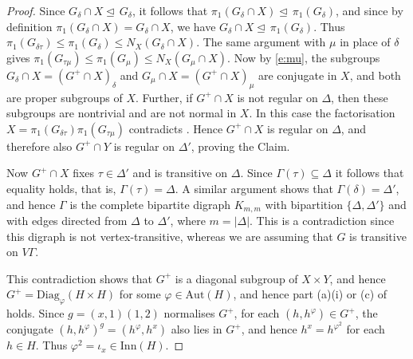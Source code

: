 \documentclass[11pt]{amsart}
\newcommand{\Aut}{\mathrm{Aut}}
\newcommand{\Inn}{\mathrm{Inn}}
\newcommand{\Diag}{\mathrm{Diag}}
\begin{document}
\begin{proof}
    Since \(G_{\delta}\cap X\unlhd\, G_{\delta}\), it follows that \(\pi_{1}(G_{\delta}\cap X)\unlhd\,\pi_{1}(G_{\delta})\), and since by definition $\pi_{1}(G_{\delta}\cap X) = G_{\delta}\cap X$, we have $G_{\delta}\cap X \unlhd\, \pi_{1}(G_{\delta})$. Thus $\pi_{1}(G_{\delta\tau})\leqslant \pi_{1}(G_{\delta})\leqslant N_X(G_\delta\cap X)$. The same argument with $\mu$ in place of $\delta$ gives $\pi_{1}(G_{\tau\mu})\leqslant \pi_{1}(G_{\mu})\leqslant N_X(G_\mu\cap X)$. Now by \eqref{e:mu}, the subgroups $G_\delta\cap X = (G^+\cap X)_\delta$ and $G_\mu\cap X = (G^+\cap X)_\mu$ are conjugate in $X$, and both are proper subgroups of $X$. Further, if \(G^+\cap X\)  is not regular on \(\Delta\), then these subgroups are nontrivial and are not normal in $X$. In this case the factorisation $X=\pi_{1}(G_{\delta\tau})\pi_{1}(G_{\tau\mu})$ contradicts \cite[Lemma 3.1]{symplectic}. Hence \(G^+\cap X\)  is regular on \(\Delta\), and therefore also \(G^+\cap Y\)  is regular on \(\Delta'\), proving the Claim.
    
    \medskip
    Now \(G^+\cap X\) fixes $\tau\in\Delta'$ and is transitive on $\Delta$. Since $\Gamma(\tau)\subseteq \Delta$ it follows that equality holds, that is, $\Gamma(\tau)= \Delta$. A similar argument shows that $\Gamma(\delta)= \Delta'$, and hence $\Gamma$ is the complete bipartite digraph $K_{m,m}$ with bipartition $\{\Delta, \Delta'\}$ and with edges directed from $\Delta$ to $\Delta'$, where $m=|\Delta|$. This is a contradiction since this digraph is not vertex-transitive, whereas we are assuming that $G$ is transitive on $V\Gamma$.

    This contradiction shows that \(G^+\) is a diagonal subgroup of $X\times Y$, and hence \(G^+=\Diag_{\varphi}(H\times H)\) for some \(\varphi\in\Aut(H)\), and hence part (a)(i) or (c) of \cite[Theorem 1.1]{Praeger03} holds. Since $g=(x,1)(1,2)$ normalises $G^+$, for each $(h,h^\varphi)\in G^+$, the conjugate $(h,h^\varphi)^g= (h^\varphi,h^x)$ also lies in $G^+$, and hence $h^x=h^{\varphi^2}$ for each $h\in H$. Thus $\varphi^2=\iota_x\in\Inn(H)$.
\end{proof}
\end{document}
